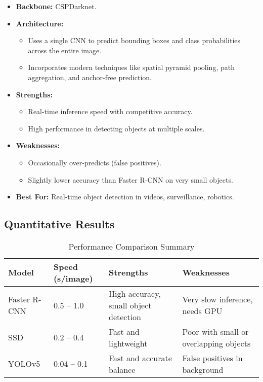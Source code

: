 \documentclass[12pt]{article}
\begin{document}
\begin{itemize}
    \item \textbf{Backbone:} CSPDarknet.
    \item \textbf{Architecture:}
    \begin{itemize}
        \item Uses a single CNN to predict bounding boxes and class probabilities across the entire image.
        \item Incorporates modern techniques like spatial pyramid pooling, path aggregation, and anchor-free prediction.
    \end{itemize}
    \item \textbf{Strengths:}
    \begin{itemize}
        \item Real-time inference speed with competitive accuracy.
        \item High performance in detecting objects at multiple scales.
    \end{itemize}
    \item \textbf{Weaknesses:}
    \begin{itemize}
        \item Occasionally over-predicts (false positives).
        \item Slightly lower accuracy than Faster R-CNN on very small objects.
    \end{itemize}
    \item \textbf{Best For:} Real-time object detection in videos, surveillance, robotics.
\end{itemize}

\subsection*{Quantitative Results}

\begin{table}[H]
\centering
\caption{Performance Comparison Summary}
\begin{tabular}{@{}l p{4cm} p{5cm} p{5cm}@{}}
\toprule
\textbf{Model} & \textbf{Speed (s/image)} & \textbf{Strengths} & \textbf{Weaknesses} \\
\midrule
Faster R-CNN & 0.5 -- 1.0 & High accuracy, small object detection & Very slow inference, needs GPU \\
SSD & 0.2 -- 0.4 & Fast and lightweight & Poor with small or overlapping objects \\
YOLOv5 & 0.04 -- 0.1 & Fast and accurate balance & False positives in background \\
\bottomrule
\end{tabular}
\end{table}
\end{document}
